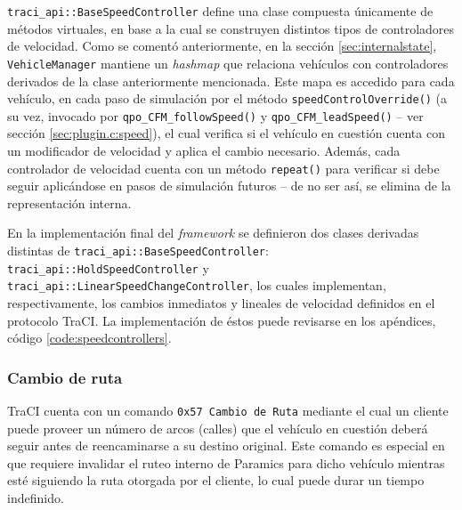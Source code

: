 \texttt{traci\_api::BaseSpeedController} define una clase compuesta únicamente de métodos virtuales, en base a la cual se construyen distintos tipos de controladores de velocidad. Como se comentó anteriormente, en la sección \ref{sec:internalstate}, \texttt{VehicleManager} mantiene un \emph{hashmap} que relaciona vehículos con controladores derivados de la clase anteriormente mencionada. Este mapa es accedido para cada vehículo, en cada paso de simulación por el método \texttt{speedControlOverride()} (a su vez, invocado por \texttt{qpo\_CFM\_followSpeed()} y \texttt{qpo\_CFM\_leadSpeed()} -- ver sección \ref{sec:plugin.c:speed}), el cual verifica si el vehículo en cuestión cuenta con un modificador de velocidad y aplica el cambio necesario. Además, cada controlador de velocidad cuenta con un método \texttt{repeat()} para verificar si debe seguir aplicándose en pasos de simulación futuros -- de no ser así, se elimina de la representación interna.



En la implementación final del \emph{framework} se definieron dos clases derivadas distintas de \texttt{traci\_api::BaseSpeedController}: \texttt{traci\_api::HoldSpeedController} y \texttt{traci\_api::LinearSpeedChangeController}, los cuales implementan, respectivamente, los cambios inmediatos y lineales de velocidad definidos en el protocolo TraCI. La implementación de éstos puede revisarse en los apéndices, código \ref{code:speedcontrollers}.

\subsubsection{Cambio de ruta}\label{sec:routeoverride}

TraCI cuenta con un comando \texttt{0x57 Cambio de Ruta} mediante el cual un cliente puede proveer un número de arcos (calles) que el vehículo en cuestión deberá seguir antes de reencaminarse a su destino original. Este comando es especial en que requiere invalidar el ruteo interno de Paramics para dicho vehículo mientras esté siguiendo la ruta otorgada por el cliente, lo cual puede durar un tiempo indefinido.

